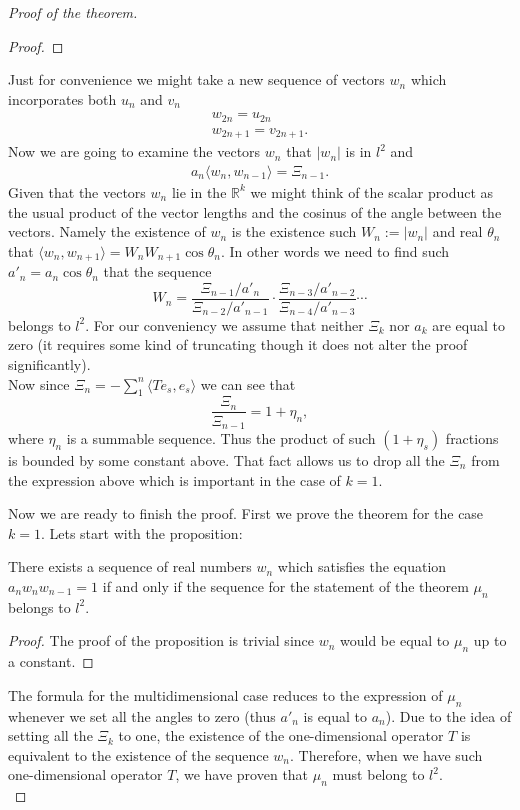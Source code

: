 \begin{proof}[Proof of the theorem]
\begin{proof}
    \end{proof}
    Just for convenience we might take a new sequence of vectors $w_n$ which incorporates both $u_n$ and $v_n$
    \begin{align*}
      w_{2n} = u_{2n}\\
      w_{2n + 1} = v_{2n + 1}.
    \end{align*}
    Now we are going to examine the vectors $w_n$ that $|w_n|$ is in $l^2$ and
    \begin{align*}
      a_{n} \langle w_{n}, w_{n - 1}\rangle = \Xi_{n - 1}.
    \end{align*}
    Given that the vectors $w_n$ lie in the $\mathbb{R}^k$ we might think of the scalar product as
    the usual product of the vector lengths and the cosinus of the angle between the vectors.
    Namely the existence of $w_n$ is the existence such $W_n := |w_n|$ and real $\theta_n$ that
    $\langle w_{n}, w_{n+1}\rangle = W_n W_{n+1} \cos{\theta_n}.$
    In other words we need to find such $a'_n = a_n \cos{\theta_n}$ that
    the sequence
    \[
      W_n = \frac{\Xi_{n-1}/a'_n}{\Xi_{n-2}/a'_{n-1}} \cdot \frac{\Xi_{n-3}/a'_{n-2}}{\Xi_{n-4}/a'_{n-3}} \cdots
    \]
    belongs to $l^2$. For our conveniency we assume that neither $\Xi_k$ nor $a_k$ are equal to zero (it requires some kind of truncating though it does not alter the proof significantly).\\
    Now since $\Xi_n = -\sum_1^n \langle Te_s, e_s\rangle$ we can see that
    \[
      \frac{\Xi_n}{\Xi_{n-1}} = 1 + \eta_n,
    \]
      where $\eta_n$ is a summable sequence.
    Thus the product of such $(1 + \eta_s)$ fractions is bounded by some constant above.
    That fact allows us to drop all the $\Xi_n$ from the expression above which is important in the case of $k = 1$.
    
    Now we are ready to finish the proof.
    First we prove the theorem for the case $k=1$. Lets start with the proposition:
    \begin{prop}
      There exists a sequence of real numbers $w_n$ which satisfies the equation $a_n w_n w_{n-1} = 1$ if and
      only if the sequence for the statement of the theorem $\mu_n$ belongs to $l^2$.
    \end{prop}
    \begin{proof}
      The proof of the proposition is trivial since $w_n$ would be equal to $\mu_n$ up to a constant.
    \end{proof}
    The formula for the multidimensional case reduces to the expression of $\mu_n$ whenever we
      set all the angles to zero (thus $a'_n$ is equal to $a_n$).
    Due to the idea of setting all the $\Xi_k$ to one, the existence of the one-dimensional operator $T$ is equivalent to the existence of the sequence $w_n$.
    Therefore, when we have such one-dimensional operator $T$, we have proven that $\mu_n$ must belong to $l^2$.\\
    

\end{proof}
